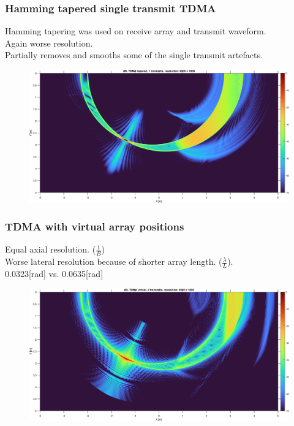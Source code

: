 \documentclass{beamer}
\begin{document}
\begin{frame}
	\frametitle{Hamming tapered single transmit TDMA}
	Hamming tapering was used on receive array and transmit waveform.\\  	
	Again worse resolution.\\
	Partially removes and smooths some of the single transmit artefacts.\\ 
	\begin{figure}
    	\includegraphics[scale=0.32]{tdma_1t_tapered.eps}\\	
	\end{figure}
\end{frame}

\begin{frame}
	\frametitle{TDMA with virtual array positions} 	
	Equal axial resolution. ($\frac{1}{B}$)\\ 
	Worse lateral resolution because of shorter array length. ($\frac{\lambda}{L}$).\\ 
	0.0323[rad] vs. 0.0635[rad]\\
	\begin{figure}
    	\includegraphics[scale=0.33]{tdma_2t_virtual.eps}\\	
	\end{figure}
\end{frame}
\end{document}

